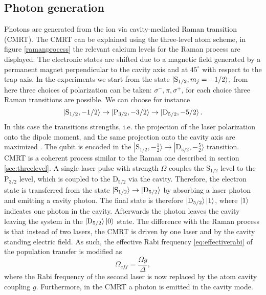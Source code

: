\subsection{Photon generation}
\label{sec:ramanprocess}
Photons are generated from the ion via cavity-mediated Raman transition (CMRT). The CMRT can be explained using the three-level atom scheme, in figure \ref{ramanprocess} the relevant calcium levels for the Raman process are displayed. The electronic states are shifted due to a magnetic field generated by a permanent magnet perpendicular to the cavity axis and at $45^{\circ}$ with respect to the trap axis. In the experiments we start from the state $\ket{\text{S}_{1/2},m_j = -1/2}$, from here three choices of polarization can be taken: $\sigma^-,\pi,\sigma^+$, for each choice three Raman transitions are possible. We can choose for instance
\begin{equation}
\ket{\text{S}_{1/2},-1/2}\to\ket{\text{P}_{3/2},-3/2} \to \ket{\text{D}_{5/2},-5/2}.
\end{equation}
In this case the transitions strengths, i.e. the projection of the laser polarization onto the dipole moment, and the same projection onto the cavity axis are maximized \cite{stuteinterface}. The qubit is encoded in the $|\text{S}_{1/2},-\frac{1}{2}\rangle \to |\text{D}_{5/2},-\frac{5}{2}\rangle$ transition. CMRT is a coherent process similar to the Raman one described in section \ref{sec:threelevel}. A single laser pulse with strength $\Omega$ couples the $\text{S}_{1/2}$ level to the $\text{P}_{3/2}$ level, which is coupled to the $\text{D}_{5/2}$ via the cavity. Therefore, the electron state is  transferred from the state $\ket{\text{S}_{1/2}} \to \ket{\text{D}_{5/2}}$  by absorbing a laser photon and emitting a cavity photon. The final state is therefore $\ket{\text{D}_{5/2}}\ket{1}$, where $\ket{1}$ indicates one photon in the cavity. Afterwards the photon leaves the cavity leaving the system in the $\ket{\text{D}_{5/2}}\ket{0}$ state.
The difference with the Raman process is that instead of two lasers, the CMRT is driven by one laser and by the cavity standing electric field. As such, the effective Rabi frequency \eqref{eq:effectiverabi} of the population transfer is modified as \cite{Barros2009}
\begin{equation}
\label{omegaeff}
\Omega_{eff} = \frac{\Omega g}{\Delta},
\end{equation}
where the Rabi frequency of the second laser is now replaced by the atom cavity coupling $g$. Furthermore, in the CMRT a photon is emitted in the cavity mode.
